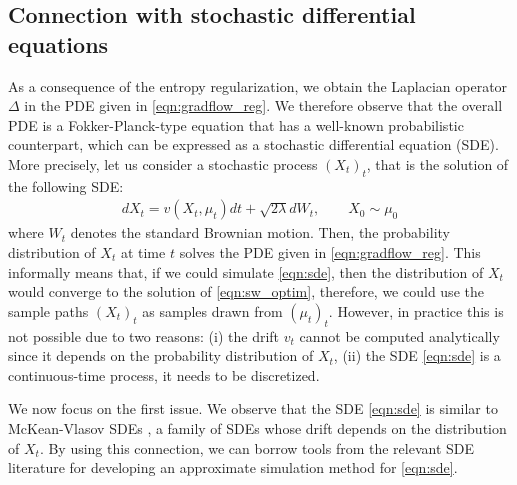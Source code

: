 \subsection{Connection with stochastic differential equations}

%
% 
As a consequence of the entropy regularization, we obtain the Laplacian operator $\Delta$ in the PDE given in \eqref{eqn:gradflow_reg}. We therefore observe that the overall PDE is a Fokker-Planck-type equation \cite{bogachev2015fokker} that has a well-known probabilistic counterpart, which can be expressed as a stochastic differential equation (SDE). More precisely, let us consider a stochastic process $(X_t)_{t}$, that is the solution of the following SDE:
\begin{align}
d X_t = v(X_t,\mu_t) dt + \sqrt{2 \lambda } d W_t, \qquad X_0 \sim \mu_0 \label{eqn:sde}
\end{align}
where $W_t$ denotes the standard Brownian motion. Then, the probability distribution of $X_t$ at time $t$ solves the PDE given in \eqref{eqn:gradflow_reg}. This informally means that, if we could simulate \eqref{eqn:sde}, then the distribution of $X_t$ would converge to the solution of \eqref{eqn:sw_optim}, therefore, we could use the sample paths $(X_t)_t$ as samples drawn from $(\mu_t)_t$. However, in practice this is not possible due to two reasons: (i) the drift $v_t$ cannot be computed analytically since it depends on the probability distribution of $X_t$, (ii) the SDE \eqref{eqn:sde} is a continuous-time process, it needs to be discretized.








We now focus on the first issue.
% 
We observe that the SDE \eqref{eqn:sde} is similar to McKean-Vlasov SDEs \cite{veretennikov2006ergodic,mishura2016existence}, a family of SDEs whose drift depends on the distribution of $X_t$. By using this connection, we can borrow tools from the relevant SDE literature \cite{malrieu03,cgm-08} for developing an approximate simulation method for \eqref{eqn:sde}.

